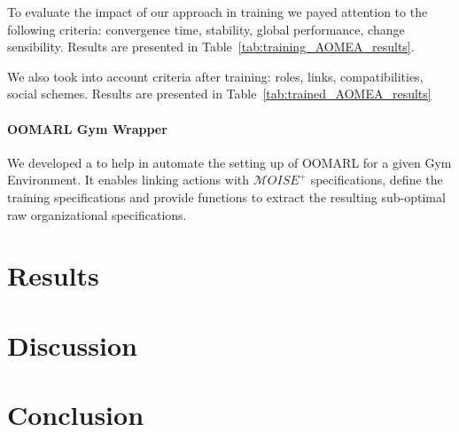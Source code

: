 \documentclass{ecai}
\begin{document}
To evaluate the impact of our approach in training we payed attention to the following criteria: convergence time, stability, global performance, change sensibility. Results are presented in Table~\ref{tab:training_AOMEA_results}.



We also took into account criteria after training: roles, links, compatibilities, social schemes. Results are presented in Table~\ref{tab:trained_AOMEA_results}



\paragraph{\textbf{OOMARL Gym Wrapper}\label{gym-wrapper}} We developed a  to help in automate the setting up of OOMARL for a given Gym Environment. It enables linking actions with $\mathcal{M}OISE^+$ specifications, define the training specifications and provide functions to extract the resulting sub-optimal raw organizational specifications.


\section{Results}



\section{Discussion}




\section{Conclusion}
\end{document}
